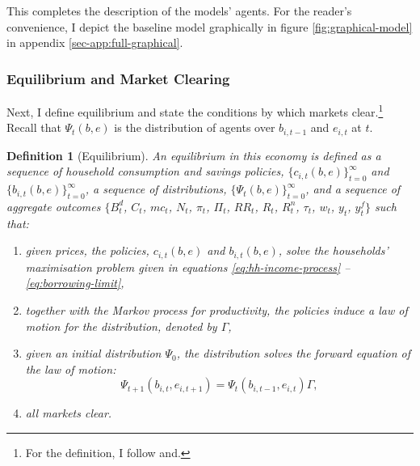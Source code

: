 \documentclass[12pt]{article} %
\numberwithin{equation}{section} %
\numberwithin{figure}{section}
\numberwithin{table}{section}
\newtheorem{definition}{Definition}
\begin{document}

This completes the description of the models' agents. For the reader's convenience, I depict the baseline model graphically in figure \ref{fig:graphical-model} in appendix \ref{sec-app:full-graphical}.

\subsubsection{Equilibrium and Market Clearing}
\label{sec:model-eq}

Next, I define equilibrium and state the conditions by which markets clear.\footnote{For the definition, I follow \textcite{gl2017} and.} Recall that $\Psi_t (b,e)$ is the distribution of agents over $b_{i,t-1}$ and $e_{i,t}$ at $t$.

\begin{definition}[Equilibrium]
\label{def:eq}
An equilibrium in this economy is defined as a sequence of household consumption and savings policies, $\{ c_{i,t} (b, e) \}_{t=0}^{\infty}$ and $\{ b_{i,t} (b, e) \}_{t=0}^{\infty}$, a sequence of distributions, $\{ \Psi_t (b,e) \}_{t=0}^{\infty} $, and a sequence of aggregate outcomes $\{ B_t^d$, $C_t$, $mc_t$, $N_t$, $\pi_t$, $\Pi_t$, $RR_t$, $R_t$, $R_t^n$, $\tau_t$, $w_t$, $y_t$, $y_t^f \}$ such that:
\begin{enumerate}
    \item given prices, the policies, $c_{i,t} (b, e)$ and $b_{i,t} (b, e)$, solve the households' maximisation problem given in equations \eqref{eq:hh-income-process} -- \eqref{eq:borrowing-limit},
    \item together with the Markov process for productivity, the policies induce a law of motion for the distribution, denoted by $\Gamma$,
    \item given an initial distribution $\Psi_0$, the distribution solves the forward equation of the law of motion:
    \begin{equation*}
        \Psi_{t+1} (b_{i,t},e_{i,t+1}) = \Psi_{t} (b_{i,t-1},e_{i,t}) \Gamma,
    \end{equation*}
    \item all markets clear.
\end{enumerate}
\end{definition}
\end{document}
